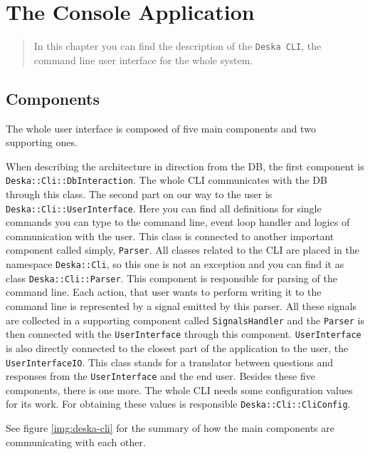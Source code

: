 \documentclass[deska]{subfiles}
\begin{document}
\chapter{The Console Application}
\label{sec:cli-app}

\begin{abstract}

In this chapter you can find the description of the {\tt Deska CLI}, the command line user interface for the whole system.

\end{abstract}

\section{Components}

The whole user interface is composed of five main components and two supporting ones.

When describing the architecture in direction from the DB, the first component is {\tt Deska::Cli::DbInteraction}. The 
whole CLI communicates with the DB through this class. The second part on our way to the user is {\tt Deska::Cli::UserInterface}.
Here you can find all definitions for single commands you can type to the command line, 
event loop handler and logics of communication with the user. This class is connected to another important component 
called simply, {\tt Parser}. All classes related to the CLI are placed in the namespace {\tt Deska::Cli}, so this one is not an 
exception and you can find it as class {\tt Deska::Cli::Parser}. This component is responsible for parsing of the 
command line. Each action, that user wants to perform writing it to the command line is represented by a signal emitted 
by this parser. All these signals are collected in a supporting component called {\tt SignalsHandler} and the {\tt Parser}
is then connected with the {\tt UserInterface} through this component. {\tt UserInterface} is also directly 
connected to the closest part of the application to the user, the {\tt UserInterfaceIO}. This class stands for a 
translator between questions and responses from the {\tt UserInterface} and the end user. Besides these five 
components, there is one more. The whole CLI needs some configuration values for its work. For obtaining these values 
is responsible {\tt Deska::Cli::CliConfig}.

See figure \ref{img:deska-cli} for the summary of how the main components are communicating with each other.
\end{document}

